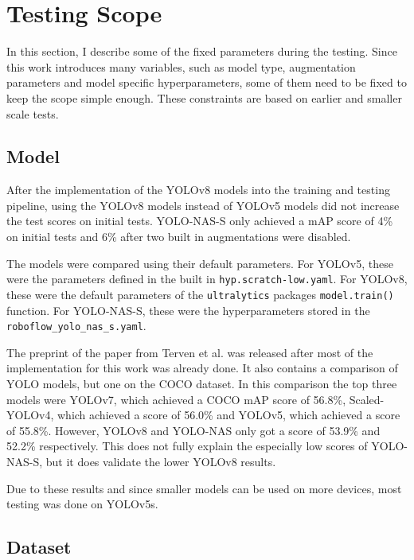\documentclass[10pt]{book}
\begin{document}
\section{Testing Scope}

In this section, I describe some of the fixed parameters during the testing. Since this work introduces many variables, such as model type, augmentation parameters and model specific hyperparameters, some of them need to be fixed to keep the scope simple enough. These constraints are based on earlier and smaller scale tests.

\subsection{Model}

After the implementation of the \ac{YOLO}v8 models into the training and testing pipeline, using the \ac{YOLO}v8 models instead of \ac{YOLO}v5 models did not increase the test scores on initial tests. \ac{YOLO}-NAS-S only achieved a \ac{mAP} score of 4\% on initial tests and 6\% after two built in augmentations were disabled.

The models were compared using their default parameters. For \ac{YOLO}v5, these were the parameters defined in the built in \texttt{hyp.scratch-low.yaml}. For \ac{YOLO}v8, these were the default parameters of the \texttt{ultralytics} packages \texttt{model.train()} function. For \ac{YOLO}-NAS-S, these were the hyperparameters stored in the \texttt{roboflow\_yolo\_nas\_s.yaml}.

The preprint of the paper from Terven et al. \cite{terven2023comprehensive} was released after most of the implementation for this work was already done. It also contains a comparison of \ac{YOLO} models, but one on the \ac{COCO} dataset. In this comparison the top three models were \ac{YOLO}v7, which achieved a \ac{COCO} \ac{mAP} score of 56.8\%, Scaled-\ac{YOLO}v4, which achieved a score of 56.0\% and \ac{YOLO}v5, which achieved a score of 55.8\%. However, \ac{YOLO}v8 and \ac{YOLO}-NAS only got a score of 53.9\% and 52.2\% respectively. This does not fully explain the especially low scores of \ac{YOLO}-NAS-S, but it does validate the lower \ac{YOLO}v8 results.

Due to these results and since smaller models can be used on more devices, most testing was done on \ac{YOLO}v5s.

\subsection{Dataset}
\end{document}

